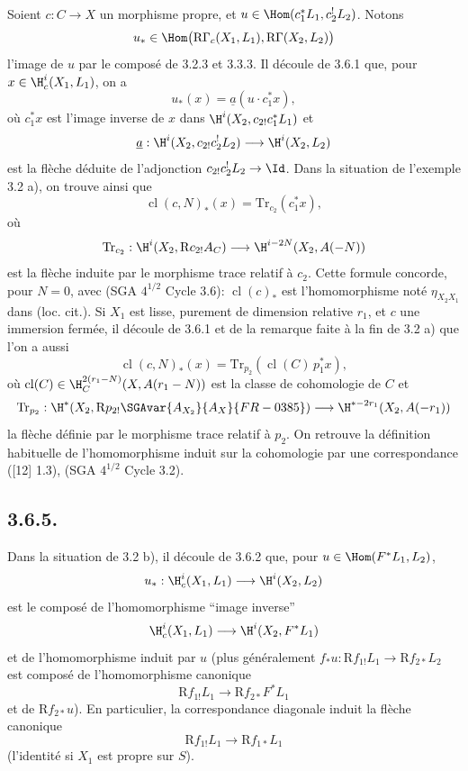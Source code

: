 Soient $c:C\to X$ un morphisme propre, et $u\in\Hom(c_1^*L_1,c_2^!L_2)$. Notons
\[
u_*\in\Hom\bigl(\mathrm{R}\Gamma_c(X_1,L_1),\mathrm{R}\Gamma(X_2,L_2)\bigr)
\]
l'image de $u$ par le composé de 3.2.3 et 3.3.3. Il découle de 3.6.1 que, pour $x\in\H_c^i(X_1,L_1)$, on a
\begin{equation}
u_*(x)=\underline{a}(u\cdot c_1^*x),
\tag{3.6.2}
\end{equation}
où $c_1^*x$ est l'image inverse de $x$ dans $\H^i(X_2,c_{2!}c_1^*L_1)$ et
\[
\underline{a}:\H^i(X_2,c_{2!}c_2^!L_2)\longrightarrow \H^i(X_2,L_2)
\]
est la flèche déduite de l'adjonction $c_{2!}c_2^!L_2\to\Id$. Dans la situation de l'exemple 3.2 a), on trouve ainsi que
\begin{equation}
\operatorname{cl}(c,N)_*(x)=\mathrm{Tr}_{c_2}(c_1^*x),
\tag{3.6.3}
\end{equation}
où
\[
\mathrm{Tr}_{c_2}:\H^i(X_2,\mathrm{R} c_{2!}A_C)\longrightarrow\H^{i-2N}(X_2,A(-N))
\]
est la flèche
induite par le morphisme trace relatif à $c_2$. Cette formule concorde, pour $N=0$, avec (SGA $4^{1/2}$ Cycle 3.6): $\operatorname{cl}(c)_*$ est l'homomorphisme noté $\eta_{X_2X_1}$ dans (loc. cit.). Si $X_1$ est lisse, purement de dimension relative $r_1$, et $c$ une immersion fermée, il découle de 3.6.1 et de la remarque faite à la fin de 3.2 a) que l'on a aussi
\begin{equation}
\operatorname{cl}(c,N)_*(x)=\mathrm{Tr}_{p_2}(\operatorname{cl}(C)\,p_1^*x),
\tag{3.6.4}
\end{equation}
où $\operatorname{cl}(C)\in \H_C^{2(r_1-N)}(X,A(r_1-N))$ est la classe de cohomologie de $C$ et
\[
\mathrm{Tr}_{p_2}:\H^*(X_2,\mathrm{R} p_{2!}\SGAvar{A_{X_2}}{A_X}{FR-0385})\longrightarrow \H^{*-2r_1}(X_2,A(-r_1))
\]
la flèche définie par le morphisme trace relatif à $p_2$. On retrouve la définition habituelle de l'homomorphisme induit sur la cohomologie par une correspondance ([12] 1.3), (SGA $4^{1/2}$ Cycle 3.2).

\subsection*{3.6.5.}
Dans la situation de 3.2 b), il découle de 3.6.2 que, pour $u\in\Hom(F^*L_1,L_2)$,
\[
u_*:\H_c^i(X_1,L_1)\longrightarrow \H^i(X_2,L_2)
\]
est le composé de l'homomorphisme ``image inverse''
\[
\H_c^i(X_1,L_1)\longrightarrow \H^i(X_2,F^*L_1)
\]
et de l'homomorphisme induit par $u$ (plus généralement $f_*u:\mathrm{R} f_{1!}L_1\to \mathrm{R} f_{2*}L_2$ est composé de l'homomorphisme canonique
\[
\mathrm{R} f_{1!}L_1\longrightarrow \mathrm{R} f_{2*}F^*L_1
\]
et de $\mathrm{R} f_{2*}u$). En particulier, la correspondance diagonale induit la flèche canonique
\[
\mathrm{R} f_{1!}L_1\longrightarrow \mathrm{R} f_{1*}L_1
\]
(l'identité si $X_1$ est propre sur $S$).

